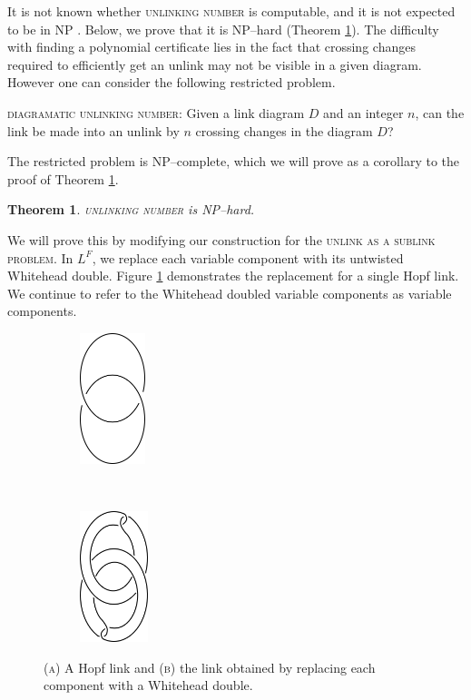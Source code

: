 \documentclass[12pt]{amsart}
\newtheorem{thm}{Theorem}
\theoremstyle{definition}
\theoremstyle{remark}
\begin{document}
It is not known whether \textsc{unlinking number} is computable, and it is not expected to be in NP \cite{Lackenby3}. Below, we prove that it is NP--hard (Theorem \ref{thm_unlinking}). The difficulty with finding a polynomial certificate lies in the fact that crossing changes required to efficiently get an unlink may not be visible in a given diagram. However one can consider the following restricted problem.


\vspace{0.14in}
\textsc{diagramatic unlinking number}: Given a link diagram $D$ and an integer $n$,  can the link be made into an unlink by $n$ crossing changes in the diagram $D$?
\vspace{0.14in}

The restricted problem is NP--complete, which we will prove as a corollary to the proof of Theorem \ref{thm_unlinking}.


\begin{thm}
\textsc{unlinking number} is NP--hard.
\label{thm_unlinking}
\end{thm}



We will prove this by modifying our construction for the \textsc{unlink as a sublink problem}.  In $L^F$,  we replace each variable component with its untwisted Whitehead double.  Figure \ref{fig_hopfwhitehead} demonstrates the replacement for a single Hopf link.  We continue to refer to the Whitehead doubled variable components as variable components.

\begin{figure}[ht]
\centering
    \begin{subfigure}[b]{0.4\textwidth}
        \centering
        \includegraphics[height=1.5in]{singlehopf.png}
        \caption{}
    \end{subfigure}%
~
    \begin{subfigure}[b]{0.4\textwidth}
        \centering
        \includegraphics[height=1.5in]{singlehopf_wdouble.png}
        \caption{}
    \end{subfigure}

\caption{(\textsc{a}) A Hopf link and (\textsc{b}) the link obtained by replacing each component with a Whitehead double.}
\label{fig_hopfwhitehead}
\end{figure}
\end{document}
